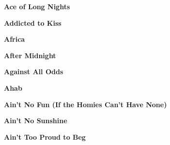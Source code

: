 \newline
\vspace{10pt} 
\begin{center}\textbf{Ace of Long Nights}\end{center}
\newline
\vspace{10pt} 
\begin{center}\textbf{Addicted to Kiss}\end{center}
\newline
\vspace{10pt} 
\begin{center}\textbf{Africa}\end{center}
\newline
\vspace{10pt} 
\begin{center}\textbf{After Midnight}\end{center}
\newline
\vspace{10pt} 
\begin{center}\textbf{Against All Odds}\end{center}
\newline
\vspace{10pt} 
\begin{center}\textbf{Ahab}\end{center}
\newline
\vspace{10pt} 
\begin{center}\textbf{Ain't No Fun (If the Homies Can't Have None)}\end{center}
\newline
\vspace{10pt} 
\begin{center}\textbf{Ain't No Sunshine}\end{center}
\newline
\vspace{10pt} 
\begin{center}\textbf{Ain't Too Proud to Beg}\end{center}
\newline
